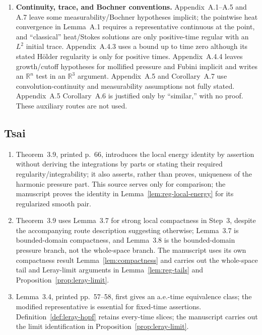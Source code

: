 \documentclass[11pt,reqno]{amsart}
\begin{document}
\begin{enumerate}
\item \textbf{Continuity, trace, and Bochner conventions.} Appendix~A.1--A.5 and A.7 leave some measurability/Bochner hypotheses implicit; the pointwise heat convergence in Lemma~A.1 requires a representative continuous at the point, and “classical” heat/Stokes solutions are only positive-time regular with an \(L^2\) initial trace. Appendix~A.4.3 uses a bound up to time zero although its stated Hölder regularity is only for positive times. Appendix~A.4.4 leaves growth/cutoff hypotheses for mollified pressure and Fubini implicit and writes an \(\mathbb R^n\) test in an \(\mathbb R^3\) argument. Appendix~A.5 and Corollary~A.7 use convolution-continuity and measurability assumptions not fully stated. Appendix~A.5 Corollary~A.6 is justified only by “similar,” with no proof. These auxiliary routes are not used.

\end{enumerate}

\subsection*{Tsai}

\begin{enumerate}
\item Theorem~3.9, printed p.~66, introduces the local energy identity by assertion without deriving the integrations by parts or stating their required regularity/integrability; it also asserts, rather than proves, uniqueness of the harmonic pressure part. This source serves only for comparison; the manuscript proves the identity in Lemma~\ref{lem:reg-local-energy} for its regularized smooth pair.

\item Theorem~3.9 uses Lemma~3.7 for strong local compactness in Step~3, despite the accompanying route description suggesting otherwise; Lemma~3.7 is bounded-domain compactness, and Lemma~3.8 is the bounded-domain pressure branch, not the whole-space branch. The manuscript uses its own compactness result Lemma~\ref{lem:compactness} and carries out the whole-space tail and Leray-limit arguments in Lemma~\ref{lem:reg-tails} and Proposition~\ref{prop:leray-limit}.

\item Lemma~3.4, printed pp.~57--58, first gives an a.e.-time equivalence class; the modified representative is essential for fixed-time assertions. Definition~\ref{def:leray-hopf} retains every-time slices; the manuscript carries out the limit identification in Proposition~\ref{prop:leray-limit}.
\end{enumerate}
\end{document}
